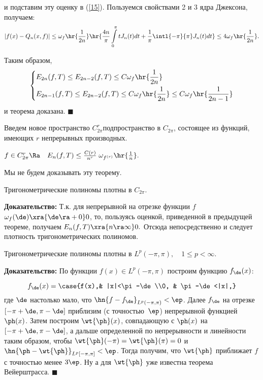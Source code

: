 \documentclass[a4paper]{article}
\begin{document}
и подставим эту оценку в (\ref{15}). Пользуемся свойствами 2 и 3
ядра Джексона, получаем:
\begin{equation*}
|f(x)-Q_n(x,f)|\le\omega_f\hr{\frac1{2n}}\hr{\frac{4n}{\pi}\int\limits_0^{\pi}tJ_n(t)dt+\frac1{\pi}\intl{-\pi}{\pi}J_n(t)dt}\le4\omega_f\hr{\frac1{2n}}.
\end{equation*}

Таким образом,
$$\left\{\begin{aligned}
&E_{2n}(f,T)\le E_{2n-2}(f,T)\le C\omega_f\hr{\frac1{2n}}\\
&E_{2n-1}(f,T)\le E_{2n-2}(f,T)\le
C\omega_f\hr{\frac1{2n}}\le
C\omega_f\hr{\frac1{2n-1}}
\end{aligned}
\right.
$$
и теорема доказана. $\blacksquare$

Введем новое пространство $C_{2\pi}^r$\т подпространство в
$C_{2\pi}$, состоящее из функций, имеющих $r$ непрерывных
производных.
\begin{theorems} $f\in
C_{2\pi}^r\Ra\quad E_n(f,T)\le
\frac{C(r)}{n^r}\;\omega_{f^{(r)}}\hr{\frac1n}.$
\end{theorems}
Мы не будем доказывать эту теорему.

\begin{theorems}[Вейерштрасс] Тригонометрические полиномы плотны в
$C_{2\pi}.$
\end{theorems}
\textbf{Доказательство:} Т.к. для непрерывной на отрезке функции
$f$ $\omega_f(\de)\xra{\de\ra +0} 0$, то,
пользуясь оценкой, приведенной в предыдущей теореме, получаем
$E_n(f,T)\xra{n\ra\infty} 0.$ Отсюда
непосредственно и следует плотность тригонометрических полиномов.

\begin{theorems} Тригонометрические полиномы плотны в
$L^p(-\pi,\pi),\quad1\le p<\infty$.
\end{theorems}
\textbf{Доказательство:} По функции $f(x)\in L^p(-\pi,\pi)$
построим функцию $f_{\de}(x)$:

\begin{wrapfigure}[8]{l}{140pt}
\end{wrapfigure}

$$f_{\de}(x)=
\case{f(x),& |x|<\pi-\de\\0, & \pi-\de<|x|,}$$
где $\de$ настолько мало, что
$\hn{f-f_{\de}}_{L^p(-\pi,\pi)}<\ep$. Далее $f_{\de}$
на отрезке $[-\pi+\de,\pi-\de]$ приблизим (с
точностью~$\ep$) непрерывной функцией $\ph(x)$. Затем
построим $\wt{\ph}(x)$, совпадающую с $\ph(x)$ на
$[-\pi+\de,\pi-\de]$, а дальше определенной по непрерывности
и линейности таким образом, чтобы
$\wt{\ph}(-\pi)=\wt{\ph}(\pi)=0$ и
$\hn{\ph-\wt{\ph}}_{L^p[-\pi,\pi]}<\ep$. Тогда
получим, что $\wt{\ph}$ приближает $f$ с точностью менее
$3\ep$. Ну а для $\wt{\ph}$ уже известна теорема
Вейерштрасса. $\blacksquare$
\end{document}
